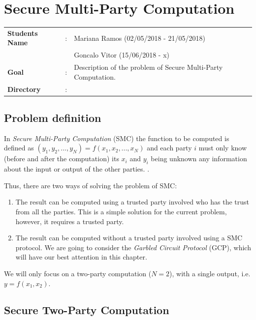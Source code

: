 \clearpage
\section{Secure Multi-Party Computation}

\begin{refsection}

\begin{tcolorbox}	
\begin{tabular}{p{2.75cm} p{0.2cm} p{10.5cm}} 	
\textbf{Students Name}      &:& Mariana Ramos (02/05/2018 - 21/05/2018) \\
\textbf && Goncalo Vitor (15/06/2018 - x)\\
\textbf{Goal}               &:& Description of the problem of Secure Multi-Party Computation.\\
\textbf{Directory}          &:& \\
\end{tabular}
\end{tcolorbox}


\subsection{Problem definition}

In \textit{Secure Multi-Party Computation} (SMC) the function to be computed is defined as $(y_1,y_2,...,y_N)=f(x_1,x_2,...,x_N)$ and each party $i$ must only know (before and after the computation) its $x_i$ and $y_i$ being unknown any information about the input or output of the other parties. \cite{Naumann16}.

Thus, there are two ways of solving the problem of SMC:

\begin{enumerate}
  \item The result can be computed using a trusted party involved who has the trust from all the parties. This is a simple solution for the current problem, however, it requires a trusted party.
  \item The result can be computed without a trusted party involved using a SMC protocol. We are going to consider the \textit{Garbled Circuit Protocol} (GCP), which will have our best attention in this chapter.
\end{enumerate}

We will only focus on a two-party computation ($N=2$), with a single output, i.e. $y = f(x_1, x_2)$.

\subsection{Secure Two-Party Computation}


\end{refsection}
